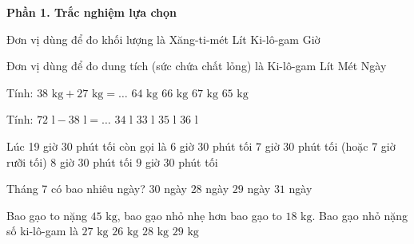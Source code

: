 \textbf{Phần 1. Trắc nghiệm lựa chọn}

\begin{ex} %
Đơn vị dùng để đo khối lượng là
\choice
{Xăng-ti-mét}
{Lít}
{\True Ki-lô-gam}
{Giờ}
\end{ex}

\begin{ex} %
Đơn vị dùng để đo dung tích (sức chứa chất lỏng) là
\choice
{Ki-lô-gam}
{\True Lít}
{Mét}
{Ngày}
\end{ex}

\begin{ex} %
Tính: $38\text{ kg} + 27\text{ kg} = \dots$
\choice
{$64\text{ kg}$}
{$66\text{ kg}$}
{$67\text{ kg}$}
{\True $65\text{ kg}$}
\end{ex}

\begin{ex} %
Tính: $72\text{ l} - 38\text{ l} = \dots$
\choice
{\True $34\text{ l}$}
{$33\text{ l}$}
{$35\text{ l}$}
{$36\text{ l}$}
\end{ex}

\begin{ex} %
Lúc 19 giờ 30 phút tối còn gọi là
\choice
{$6$ giờ $30$ phút tối}
{\True $7$ giờ $30$ phút tối (hoặc 7 giờ rưỡi tối)}
{$8$ giờ $30$ phút tối}
{$9$ giờ $30$ phút tối}
\end{ex}

\begin{ex} %
Tháng 7 có bao nhiêu ngày?
\choice
{$30$ ngày}
{$28$ ngày}
{$29$ ngày}
{\True $31$ ngày}
\end{ex}

\begin{ex} %
Bao gạo to nặng $45\text{ kg}$, bao gạo nhỏ nhẹ hơn bao gạo to $18\text{ kg}$. Bao gạo nhỏ nặng số ki-lô-gam là
\choice
{\True $27\text{ kg}$}
{$26\text{ kg}$}
{$28\text{ kg}$}
{$29\text{ kg}$}
\end{ex}

